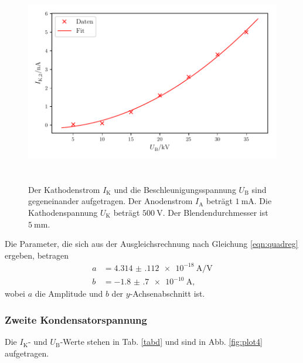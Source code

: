 

\begin{figure}
    \centering
    \includegraphics[width=15cm, height=9cm]{build/plot3.pdf}
    \caption{Der Kathodenstrom $I_\text{K}$ und die Beschleunigungsspannung $U_\text{B}$ sind gegeneinander aufgetragen. Der Anodenstrom $I_\text{A}$ beträgt $\SI{1}{\milli\ampere}$. Die Kathodenspannung $U_\text{K}$ beträgt $\SI{500}{\volt}$. Der Blendendurchmesser ist $\SI{5}{\milli\meter}.$}
    \label{fig:plot3}
\end{figure}

\noindent Die Parameter, die sich aus der Ausgleichsrechnung nach Gleichung \eqref{eqn:quadreg} ergeben, betragen
\begin{align*}
    a &= \SI{4.314(112)e-18}{\ampere\per\volt}\\
    b &= \SI{-1.8(7)e-10}{\ampere},
\end{align*}
wobei $a$ die Amplitude und $b$ der $y$-Achsenabschnitt ist. 

\subsubsection{Zweite Kondensatorspannung}
Die $I_\text{K}$- und $U_\text{B}$-Werte stehen in Tab. \ref{tabd} und sind in Abb. \ref{fig:plot4} aufgetragen. 

